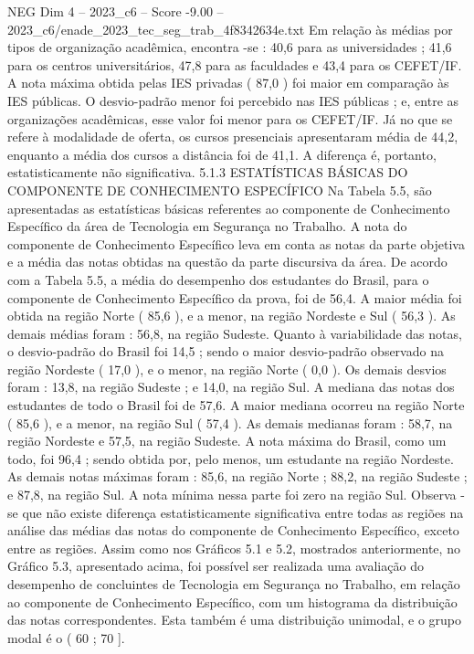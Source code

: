 \begin{textsample}{NEG Dim 4 – 2023\_c6 – Score -9.00 – 2023\_c6/enade\_2023\_tec\_seg\_trab\_4f8342634e.txt}
Em relação às médias por tipos de organização acadêmica, encontra -se : 40,6 para as universidades ; 41,6 para os centros universitários, 47,8 para as faculdades e 43,4 para os CEFET/IF.
A nota máxima obtida pelas IES privadas ( 87,0 ) foi maior em comparação às IES públicas.
O desvio-padrão menor foi percebido nas IES públicas ; e, entre as organizações acadêmicas, esse valor foi menor para os CEFET/IF.
Já no que se refere à modalidade de oferta, os cursos presenciais apresentaram média de 44,2, enquanto a média dos cursos a distância foi de 41,1.
A diferença é, portanto, estatisticamente não significativa. 5.1.3 ESTATÍSTICAS BÁSICAS DO COMPONENTE DE CONHECIMENTO ESPECÍFICO Na Tabela 5.5, são apresentadas as estatísticas básicas referentes ao componente de Conhecimento Específico da área de Tecnologia em Segurança no Trabalho.
A nota do componente de Conhecimento Específico leva em conta as notas da parte objetiva e a média das notas obtidas na questão da parte discursiva da área.
De acordo com a Tabela 5.5, a média do desempenho dos estudantes do Brasil, para o componente de Conhecimento Específico da prova, foi de 56,4.
A maior média foi obtida na região Norte ( 85,6 ), e a menor, na região Nordeste e Sul ( 56,3 ).
As demais médias foram : 56,8, na região Sudeste.
Quanto à variabilidade das notas, o desvio-padrão do Brasil foi 14,5 ; sendo o maior desvio-padrão observado na região Nordeste ( 17,0 ), e o menor, na região Norte ( 0,0 ).
Os demais desvios foram : 13,8, na região Sudeste ; e 14,0, na região Sul.
A mediana das notas dos estudantes de todo o Brasil foi de 57,6.
A maior mediana ocorreu na região Norte ( 85,6 ), e a menor, na região Sul ( 57,4 ).
As demais medianas foram : 58,7, na região Nordeste e 57,5, na região Sudeste.
A nota máxima do Brasil, como um todo, foi 96,4 ; sendo obtida por, pelo menos, um estudante na região Nordeste.
As demais notas máximas foram : 85,6, na região Norte ; 88,2, na região Sudeste ; e 87,8, na região Sul.
A nota mínima nessa parte foi zero na região Sul.
Observa -se que não existe diferença estatisticamente significativa entre todas as regiões na análise das médias das notas do componente de Conhecimento Específico, exceto entre as regiões.
Assim como nos Gráficos 5.1 e 5.2, mostrados anteriormente, no Gráfico 5.3, apresentado acima, foi possível ser realizada uma avaliação do desempenho de concluintes de Tecnologia em Segurança no Trabalho, em relação ao componente de Conhecimento Específico, com um histograma da distribuição das notas correspondentes.
Esta também é uma distribuição unimodal, e o grupo modal é o ( 60 ; 70 ].

\end{textsample}
